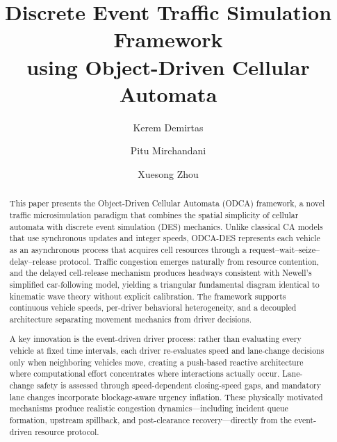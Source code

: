 \documentclass[review,authoryear]{elsarticle}
\begin{document}
\begin{frontmatter}

\title{Discrete Event Traffic Simulation Framework\\using Object-Driven Cellular Automata}

\author[asu]{Kerem Demirtas}
\author[asu]{Pitu Mirchandani}
\author[ssebe]{Xuesong Zhou}


\begin{abstract}
This paper presents the Object-Driven Cellular Automata (ODCA) framework, a novel traffic microsimulation paradigm that combines the spatial simplicity of cellular automata with discrete event simulation (DES) mechanics. Unlike classical CA models that use synchronous updates and integer speeds, ODCA-DES represents each vehicle as an asynchronous process that acquires cell resources through a request--wait--seize--delay--release protocol. Traffic congestion emerges naturally from resource contention, and the delayed cell-release mechanism produces headways consistent with Newell's simplified car-following model, yielding a triangular fundamental diagram identical to kinematic wave theory without explicit calibration. The framework supports continuous vehicle speeds, per-driver behavioral heterogeneity, and a decoupled architecture separating movement mechanics from driver decisions.

A key innovation is the event-driven driver process: rather than evaluating every vehicle at fixed time intervals, each driver re-evaluates speed and lane-change decisions only when neighboring vehicles move, creating a push-based reactive architecture where computational effort concentrates where interactions actually occur. Lane-change safety is assessed through speed-dependent closing-speed gaps, and mandatory lane changes incorporate blockage-aware urgency inflation. These physically motivated mechanisms produce realistic congestion dynamics---including incident queue formation, upstream spillback, and post-clearance recovery---directly from the event-driven resource protocol.


\end{abstract}
\end{frontmatter}
\end{document}
